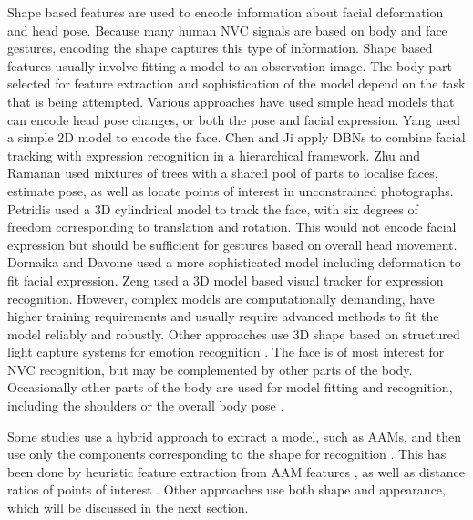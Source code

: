Shape based features are used to encode information about facial deformation and head pose. Because many human \ac{NVC} signals are based on body and face gestures, encoding the shape captures this type of information. Shape based features usually involve fitting a model to an observation image. The body part selected for feature extraction and sophistication of the model depend on the task that is being attempted. Various approaches have used simple head models that can encode head pose changes, or both the pose and facial expression. Yang \etal \cite{Yang2009} used a simple 2{D} model to encode the face. Chen and Ji \cite{Chen2011} apply \acl{DBN}s to combine facial tracking with expression recognition in a hierarchical framework. Zhu and Ramanan \cite{Zhu2012} used mixtures of trees with a shared pool of parts to localise faces, estimate pose, as well as locate points of interest in unconstrained photographs. Petridis \etal \cite{Petridis2009} used a 3{D} cylindrical model to track the face, with six degrees of freedom corresponding to translation and rotation. This would not encode facial expression but should be sufficient for gestures based on overall head movement. Dornaika and Davoine \cite{Dornaika2005} used a more sophisticated model including deformation to fit facial expression. Zeng \etal \cite{Zeng2006} used a {3D} model based visual tracker for expression recognition. However, complex models are computationally demanding, have higher training requirements and usually require advanced methods to fit the model reliably and robustly. Other approaches use 3{D} shape based on structured light capture systems for emotion recognition \cite{Sandbach2011, Fanelli2010b, Chen2011}. The face is of most interest for \ac{NVC} recognition, but may be complemented by other parts of the body. Occasionally other parts of the body are used for model fitting and recognition, including the shoulders \cite{Petridis2009} or the overall body pose \cite{Bernhardt07}.

Some studies use a hybrid approach to extract a model, such as \ac{AAM}s, and then use only the components corresponding to the shape for recognition \cite{Girard2011}. This has been done by heuristic feature extraction from \ac{AAM} features \cite{Datcu2007}, as well as distance ratios of points of interest \cite{Tang2007}. Other approaches use both shape and appearance, which will be discussed in the next section.

